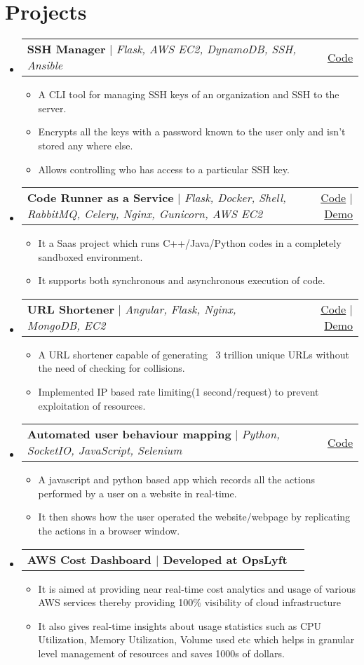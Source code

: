 \documentclass[letterpaper,11pt]{article}
\makeatletter
\newcommand{\resumeItem}[1]{
  \item\small{
    {#1 \vspace{-2pt}}
  }
}
\newcommand{\resumeProjectHeading}[2]{
    \item
    \begin{tabular*}{0.97\textwidth}{l@{\extracolsep{\fill}}r}
      \small#1 & #2 \\
    \end{tabular*}\vspace{-7pt}
}
\newcommand{\resumeSubHeadingListStart}{\begin{itemize}[leftmargin=0.15in, label={}]}
\newcommand{\resumeSubHeadingListEnd}{\end{itemize}}
\newcommand{\resumeItemListStart}{\begin{itemize}}
\newcommand{\resumeItemListEnd}{\end{itemize}\vspace{-5pt}}
\makeatother
\begin{document}
\section{Projects}
    \resumeSubHeadingListStart
      \resumeProjectHeading
          {\textbf{SSH Manager} $|$ \emph{Flask, AWS EC2, DynamoDB, SSH, Ansible}}{\href{https://github.com/thephilomaths/ssh-key-manager}{Code}}
          \resumeItemListStart
            \resumeItem{A CLI tool for managing SSH keys of an organization and SSH to the server.}
            \resumeItem{Encrypts all the keys with a password known to the user only and isn’t stored any where else.}
            \resumeItem{Allows controlling who has access to a particular SSH key.}
          \resumeItemListEnd
      \resumeProjectHeading
          {\textbf{Code Runner as a Service} $|$ \emph{Flask, Docker, Shell, RabbitMQ, Celery, Nginx, Gunicorn, AWS EC2}}{\href{https://github.com/thephilomaths/code-runner-as-a-service}{Code} $|$ \href{https://documenter.getpostman.com/view/4843397/TW76E5ZA}{Demo}}
          \resumeItemListStart
            \resumeItem{It a Saas project which runs C++/Java/Python codes in a completely sandboxed environment.}
            \resumeItem{It supports both synchronous and asynchronous execution of code.}
         \resumeItemListEnd
      \resumeProjectHeading
          {\textbf{URL Shortener} $|$ \emph{Angular, Flask, Nginx, MongoDB, EC2}}{\href{https://github.com/kartikbehl99/URL-shortener-public}{Code} $|$ \href{https://smol.ga}{Demo}}
          \resumeItemListStart
            \resumeItem{A URL shortener capable of generating ~3 trillion unique URLs without the need of checking for collisions.}
          \resumeItem{Implemented IP based rate limiting(1 second/request) to prevent exploitation of resources.}
          \resumeItemListEnd
      \resumeProjectHeading
          {\textbf{Automated user behaviour mapping} $|$ \emph{Python, SocketIO, JavaScript, Selenium}}{\href{https://github.com/kartikbehl99/automated-user-behaviour-mapping}{Code}}
          \resumeItemListStart
            \resumeItem{A javascript and python based app which records all the actions performed by a user on a website in real-time.}
            \resumeItem{It then shows how the user operated the website/webpage by replicating the actions in a browser window.}
          \resumeItemListEnd
      \resumeProjectHeading
          {\textbf{AWS Cost Dashboard $|$ Developed at OpsLyft}}{}{}
          \resumeItemListStart
            \resumeItem{It is aimed at providing near real-time cost analytics and usage of various AWS services thereby providing 100\% visibility of cloud infrastructure}
            \resumeItem{It also gives real-time insights about usage statistics such as CPU Utilization, Memory Utilization, Volume used etc which helps in granular level management of resources and saves 1000s of dollars.}
         \resumeItemListEnd
    \resumeSubHeadingListEnd
\end{document}
